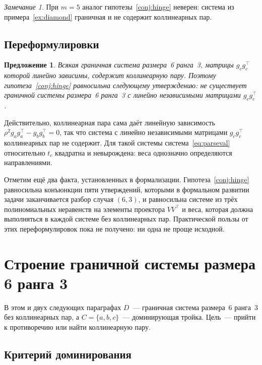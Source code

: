 \documentclass[11pt,a4paper]{article}
\theoremstyle{plain}
\newtheorem{proposition}[theorem]{Предложение}
\theoremstyle{definition}
\theoremstyle{remark}
\newtheorem{remark}[theorem]{Замечание}
\newcommand{\T}{^{\!\top}}
\begin{document}
\begin{remark}
При $m=5$ аналог гипотезы~\ref{conj:hinge} неверен: система из
примера~\ref{ex:diamond} граничная и не содержит коллинеарных пар.
\end{remark}

\subsection{Переформулировки}

\begin{proposition}\label{prop:stressfree}
Всякая граничная система размера~6 ранга~3, матрицы $g_cg_c\T$ которой
линейно зависимы, содержит коллинеарную пару. Поэтому гипотеза~\ref{conj:hinge}
равносильна следующему утверждению: не существует граничной системы
размера~6 ранга~3 с линейно независимыми матрицами $g_cg_c\T$.
\end{proposition}

Действительно, коллинеарная пара сама даёт линейную зависимость
$\rho^2g_ag_a\T-g_bg_b\T=0$, так что система с линейно независимыми матрицами
$g_cg_c\T$ коллинеарных пар не содержит. Для такой системы
система~\eqref{eq:parseval} относительно $t_c$ квадратна и невырождена:
веса однозначно определяются направлениями.

Отметим ещё два факта, установленных в формализации. Гипотеза~\ref{conj:hinge}
равносильна конъюнкции пяти утверждений, которыми в формальном развитии
задачи заканчивается разбор случая $(6,3)$, и равносильна системе из трёх
полиномиальных неравенств на элементы проектора $VV\T$ и веса, которая должна
выполняться в каждой системе без коллинеарных пар. Практической пользы от
этих переформулировок пока не получено: ни одна не проще исходной.

\section{Строение граничной системы размера 6 ранга 3}\label{sec:anatomy}

В этом и двух следующих параграфах $D$~--- граничная система размера~6
ранга~3 без коллинеарных пар, а $C=\{a,b,c\}$~--- доминирующая тройка. Цель~---
прийти к противоречию или найти коллинеарную пару.

\subsection{Критерий доминирования}
\end{document}
